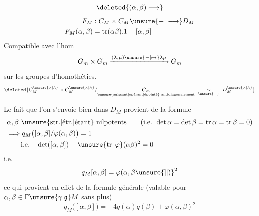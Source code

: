 \[
\deleted{(\alpha,\beta)\longmapsto}
\]
\[
\begin{aligned}
F_M&:C_M\times C_M\unsure{-|\longrightarrow}D_M\\
F_M(\alpha,\beta)&=\operatorname{tr}(\alpha\beta).1-[\alpha,\beta]
\end{aligned}
\]
Compatible avec l'hom
\[
G_m\times G_m\xrightarrow{(\lambda,\mu)\unsure{-|\mapsto}\lambda\mu}G_m
\]
sur les groupes d'homothéties. 
\[
\deleted{C_M^{\unsure{\times|\wedge}}\times C_M^{\unsure{\times|\wedge}}/\underset{\text{\unsure{agissant|opérant|épointé} antidiagonalement}}{G_m}\ \underset{\unsure{-}}{\sim}\ D_M^{\unsure{\times|\wedge}}}
\]

Le fait que l'on s'envoie bien dans $D_M$ provient de la formule
\[
\begin{aligned}
&\alpha,\beta\ \text{\unsure{str.|étr.|étant} nilpotents}\qquad(\text{i.e. }\det\alpha=\det\beta=\operatorname{tr}\alpha=\operatorname{tr}\beta=0)\\
&\Longrightarrow q_M\bigl([\alpha,\beta]/\varphi(\alpha,\beta)\bigr)=1\\
&\hspace{2em}\text{i.e.}\quad\det([\alpha,\beta])+\unsure{\operatorname{tr}|\varphi}(\alpha\beta)^2=0
\end{aligned}
\]
i.e.
\[
q_M[\alpha,\beta]=\varphi(\alpha,\beta{\unsure{]|)}}^2
\]
ce qui provient en effet de la formule générale (valable pour $\alpha,\beta\in\Gamma\unsure{\gamma|\mathfrak g}M$ sans plus)
\[
q_M\bigl([\alpha,\beta]\bigr)=-4q(\alpha)q(\beta)+\varphi(\alpha,\beta)^2
\]
